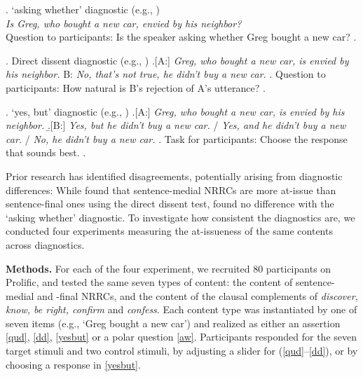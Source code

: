 \documentclass[11pt, a4paper]{article}
\newif\ifparens\parensfalse
\newcommand\pref[1]{{\parenstrue\ref{#1}}}
\begin{document}
  \ex. \label{aw}%
    `asking whether' diagnostic (e.g., \citealt{tonhauser_how_2018,solstad_cataphoric_2024})\\
      \emph{Is Greg, who bought a new car, envied by his neighbor?}
  \\ Question to participants: Is the speaker asking whether Greg bought a new car?
  \z.

  \ex. \label{dd} Direct dissent diagnostic (e.g., \citealt{tonhauser_diagnosing_2012,syrett_experimental_2015})
    \a.[A:] \emph{Greg, who bought a new car, is envied by his neighbor.}
     \hfill 
      B: \hspace{.5em} \emph{No, that's not true, he didn't buy a new car.}
    \z.
  Question to participants: How natural is B's rejection of A's utterance?
  \z.

  \ex. \label{yesbut}%
    `yes, but' diagnostic (e.g., \citealt{xue_correlation_2011,destruel_cross-linguistic_2015})
    \a.[A:] \emph{Greg, who bought a new car, is envied by his neighbor.}
    \b.[B:] \emph{Yes, but he didn't buy a new car.} / \emph{Yes, and he didn't buy a new car.} / \emph{No, he didn't buy a new car.}
    \z.
    Task for participants: Choose the response that sounds best.
  \z.

  Prior research has identified disagreements, potentially arising from  diagnostic differences: While \citealt{syrett_experimental_2015} found that sentence-medial NRRCs are more at-issue than sentence-final ones using the direct dissent test, \citealt{drozdov_projection_2024} found no difference with the `asking whether' diagnostic. To investigate how consistent the diagnostics are, we conducted four experiments measuring the at-issueness of the same contents across diagnostics.

\vspace{.1\baselineskip} \noindent
{\bf Methods.}
  For each of the four experiment, we recruited 80 participants on Prolific, and tested the same seven types of content: the content of sentence-medial and -final NRRCs, and the content of the clausal complements of \emph{discover, know, be right, confirm} and \emph{confess}. Each content type was instantiated by one of seven items (e.g., `Greg bought a new car') and realized as either an assertion \ref{qud}, \ref{dd}, \ref{yesbut} or a polar question \ref{aw}. Participants responded for the seven target stimuli and two control stimuli, by adjusting a slider for (\pref{qud}--\pref{dd}), or by choosing a response in \ref{yesbut}.
\end{document}
